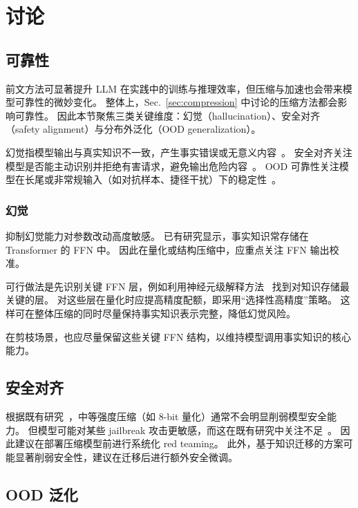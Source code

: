 \section{讨论}

\subsection{可靠性}

前文方法可显著提升 LLM 在实践中的训练与推理效率，但压缩与加速也会带来模型可靠性的微妙变化。
整体上，Sec.~\ref{sec:compression} 中讨论的压缩方法都会影响可靠性。
因此本节聚焦三类关键维度：幻觉（hallucination）、安全对齐（safety alignment）与分布外泛化（OOD generalization）。

幻觉指模型输出与真实知识不一致，产生事实错误或无意义内容~\cite{huang2023survey}。
安全对齐关注模型是否能主动识别并拒绝有害请求，避免输出危险内容~\cite{ouyang2022training}。
OOD 可靠性关注模型在长尾或非常规输入（如对抗样本、捷径干扰）下的稳定性~\cite{geirhos2020shortcut}。

\subsubsection{幻觉}

抑制幻觉能力对参数改动高度敏感。
已有研究显示，事实知识常存储在 Transformer 的 FFN 中。
因此在量化或结构压缩中，应重点关注 FFN 输出校准。

可行做法是先识别关键 FFN 层，例如利用神经元级解释方法~\cite{DBLP:conf/nips/MengBAB22} 找到对知识存储最关键的层。
对这些层在量化时应提高精度配额，即采用“选择性高精度”策略。
这样可在整体压缩的同时尽量保持事实知识表示完整，降低幻觉风险。

在剪枝场景，也应尽量保留这些关键 FFN 结构，以维持模型调用事实知识的核心能力。

\subsection{安全对齐}

根据既有研究~\cite{yuan2023rptq}，中等强度压缩（如 8-bit 量化）通常不会明显削弱模型安全能力。
但模型可能对某些 jailbreak 攻击更敏感，而这在既有研究中关注不足~\cite{deng2023jailbreaker}。
因此建议在部署压缩模型前进行系统化 red teaming。
此外，基于知识迁移的方案可能显著削弱安全性，建议在迁移后进行额外安全微调。

\subsection{OOD 泛化}

